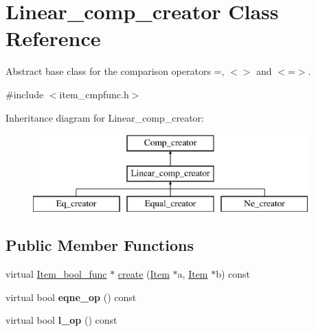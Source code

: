 \hypertarget{classLinear__comp__creator}{}\section{Linear\+\_\+comp\+\_\+creator Class Reference}
\label{classLinear__comp__creator}


Abstract base class for the comparison operators =, $<$$>$ and $<$=$>$.  




{\ttfamily \#include $<$item\+\_\+cmpfunc.\+h$>$}

Inheritance diagram for Linear\+\_\+comp\+\_\+creator\+:\begin{figure}[H]
\begin{center}
\leavevmode
\includegraphics[height=3.000000cm]{classLinear__comp__creator}
\end{center}
\end{figure}
\subsection*{Public Member Functions}
\begin{DoxyCompactItemize}
\item 
virtual \mbox{\hyperlink{classItem__bool__func}{Item\+\_\+bool\+\_\+func}} $\ast$ \mbox{\hyperlink{classLinear__comp__creator_abf8d17944a06f0f90a187f4d99e06319}{create}} (\mbox{\hyperlink{classItem}{Item}} $\ast$a, \mbox{\hyperlink{classItem}{Item}} $\ast$b) const
\item 
\mbox{\label{classLinear__comp__creator_a633f7e5bf2bfda0fce0e6dc45d265346}} 
virtual bool {\bfseries eqne\+\_\+op} () const
\item 
\mbox{\label{classLinear__comp__creator_a70ab8bf2c7aacf21e84cf54c008c6b0c}} 
virtual bool {\bfseries l\+\_\+op} () const
\end{DoxyCompactItemize}
